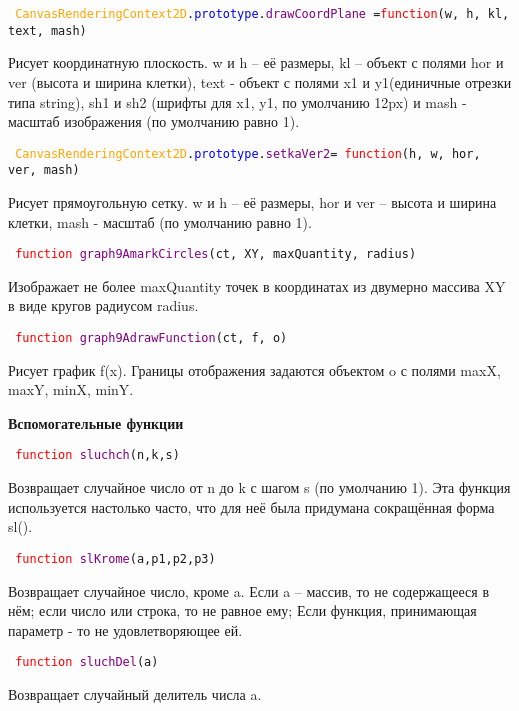 \hypertarget{drawCoordPlane}{\texttt{
		\textcolor{Orange}{CanvasRenderingContext2D}.\textcolor{Blue}{prototype}.\textcolor{Purple}{drawCoordPlane }=\textcolor{Red}{function}(w, h, kl, text, mash)
	}}

Рисует координатную плоскость. w и h  \--- её размеры, kl \--- объект с полями hor и ver (высота и ширина клетки), text \-- объект с полями x1 и y1(единичные отрезки типа string), sh1 и sh2 (шрифты для x1, y1, по умолчанию 12px) и mash - масштаб изображения (по умолчанию равно 1).

\texttt{
	\textcolor{Orange}{CanvasRenderingContext2D}.\textcolor{Blue}{prototype}.\textcolor{Purple}{setkaVer2}=
	\newline
	\textcolor{Red}{function}(h, w, hor, ver, mash)
}

Рисует прямоугольную сетку. w и h  \--- её размеры, hor и ver \--- высота и ширина клетки, mash - масштаб (по умолчанию равно 1).

\hypertarget{graph9AmarkCircles}{\texttt{
		\textcolor{Red}{function} \textcolor{Purple}{graph9AmarkCircles}(ct, XY, maxQuantity, radius)
	}}

Изображает не более maxQuantity точек в координатах из двумерно массива XY в виде кругов радиусом radius.

\hypertarget{graph9AdrawFunction}{\texttt{
		\textcolor{Red}{function} \textcolor{Purple}{graph9AdrawFunction}(ct, f, o)
	}}

Рисует график f(x). Границы отображения задаются объектом o с полями maxX, maxY, minX, minY.

\textbf{Вспомогательные функции}

\hypertarget{sluchch}{\texttt{
		\textcolor{Red}{function} \textcolor{Purple}{sluchch}(n,k,s)
	}}

Возвращает случайное число от n до k с шагом s (по умолчанию 1).
Эта функция используется настолько часто, что для неё была придумана сокращённая форма sl().

\hypertarget{slKrome}{\texttt{
		\textcolor{Red}{function} \textcolor{Purple}{slKrome}(a,p1,p2,p3)
	}}

Возвращает случайное число, кроме a. Если a \--- массив, то не содержащееся в нём; если число или строка, то не равное ему; Если функция, принимающая параметр - то не удовлетворяющее ей.

\texttt{
	\textcolor{Red}{function} \textcolor{Purple}{sluchDel}(a)
}

Возвращает случайный делитель числа a.

